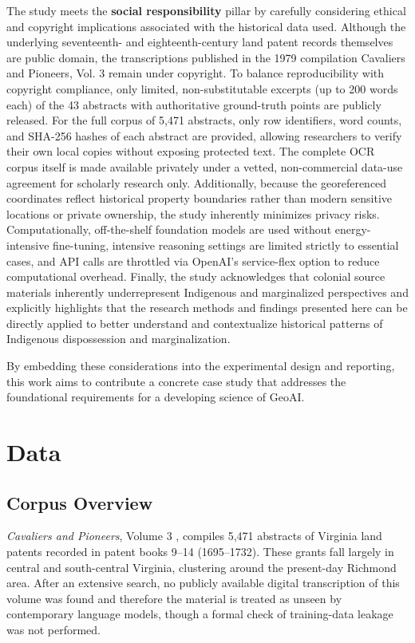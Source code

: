 The study meets the \textbf{social responsibility} pillar by carefully
considering ethical and copyright implications associated with the
historical data used. Although the underlying seventeenth- and
eighteenth-century land patent records themselves are public domain, the
transcriptions published in the 1979 compilation Cavaliers and Pioneers,
Vol. 3 remain under copyright. To balance reproducibility with copyright
compliance, only limited, non-substitutable excerpts (up to 200 words
each) of the 43 abstracts with authoritative ground-truth points are
publicly released. For the full corpus of 5,471 abstracts, only row
identifiers, word counts, and SHA-256 hashes of each abstract are
provided, allowing researchers to verify their own local copies without
exposing protected text. The complete OCR corpus itself is made
available privately under a vetted, non-commercial data-use agreement
for scholarly research only. Additionally, because the georeferenced
coordinates reflect historical property boundaries rather than modern
sensitive locations or private ownership, the study inherently minimizes
privacy risks. Computationally, off-the-shelf foundation models are used
without energy-intensive fine-tuning, intensive reasoning settings are
limited strictly to essential cases, and API calls are throttled via
OpenAI's service-flex option to reduce computational overhead. Finally,
the study acknowledges that colonial source materials inherently
underrepresent Indigenous and marginalized perspectives and explicitly
highlights that the research methods and findings presented here can be
directly applied to better understand and contextualize historical
patterns of Indigenous dispossession and marginalization.

By embedding these considerations into the experimental design and
reporting, this work aims to contribute a concrete case study that
addresses the foundational requirements for a developing science of
GeoAI.

\section{Data}\label{data}

\subsection{Corpus Overview}\label{corpus-overview}

\emph{Cavaliers and Pioneers}, Volume 3 \citep{Nugent1979_cavaliers3},
compiles 5,471 abstracts of Virginia land patents recorded in patent
books 9--14 (1695--1732). These grants fall largely in central and
south-central Virginia, clustering around the present-day Richmond area.
After an extensive search, no publicly available digital transcription
of this volume was found and therefore the material is treated as unseen
by contemporary language models, though a formal check of training-data
leakage was not performed.

